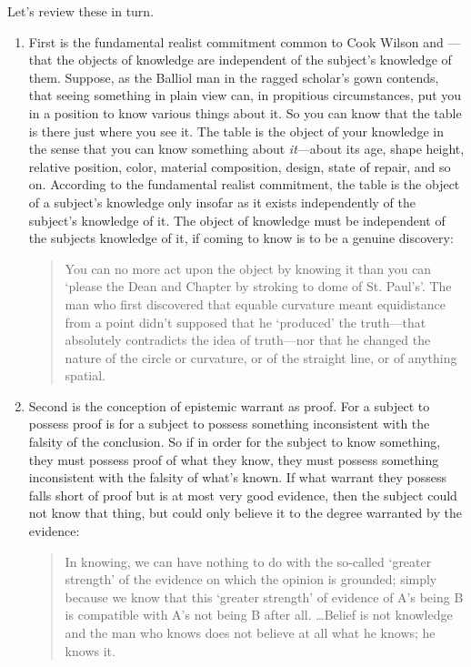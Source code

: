 \documentclass[12pt]{article}
\begin{document}
Let's review these in turn.

\begin{enumerate}[(1)]
	\item First is the fundamental realist commitment common to Cook Wilson and \citet{Moore:1903uo}\----that the objects of knowledge are independent of the subject's knowledge of them. Suppose, as the Balliol man in the ragged scholar's gown contends, that seeing something in plain view can, in propitious circumstances, put you in a position to know various things about it. So you can know that the table is there just where you see it. The table is the object of your knowledge in the sense that you can know something about \emph{it}---about its age, shape height, relative position, color, material composition, design, state of repair, and so on. According to the fundamental realist commitment, the table is the object of a subject's knowledge only insofar as it exists independently of the subject's knowledge of it. The object of knowledge must be independent of the subjects knowledge of it, if coming to know is to be a genuine discovery:
		\begin{quote}
			You can no more act upon the object by knowing it than you can `please the Dean and Chapter by stroking to dome of St. Paul's'. The man who first discovered that equable curvature meant equidistance from a point didn't supposed that he `produced' the truth---that absolutely contradicts the idea of truth---nor that he changed the nature of the circle or curvature, or of the straight line, or of anything spatial. \citep[\emph{Correspondence with Prichard 1904},][802]{Cook-Wilson:1926sf}
		\end{quote}
	\item Second is the conception of epistemic warrant as proof. For a subject to possess proof is for a subject to possess something inconsistent with the falsity of the conclusion. So if in order for the subject to know something, they must possess proof of what they know, they must possess something inconsistent with the falsity of what's known. If what warrant they possess falls short of proof but is at most very good evidence, then the subject could not know that thing, but could only believe it to the degree warranted by the evidence: 
		\begin{quote}
			In knowing, we can have nothing to do with the so-called `greater strength' of the evidence on which the opinion is grounded; simply because we know that this `greater strength' of evidence of A's being B is compatible with A's not being B after all. \ldots Belief is not knowledge and the man who knows does not believe at all what he knows; he knows it. \citep[\emph{Statement and Inference} \textsc{ii}.3, \emph{Opinion, Conviction, Belief and Cognate States},][100]{Cook-Wilson:1926sf}

\end{quote}
\end{enumerate}
\end{document}
